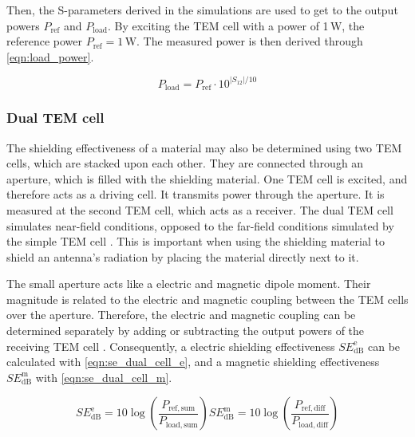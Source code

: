 Then, the S-parameters derived in the simulations are used to get to the output powers $P_\mathrm{ref}$ and $P_\mathrm{load}$. By exciting the TEM cell with a power of 1\,W, the reference power $P_\mathrm{ref}=1\,\mathrm{W}$. The measured power is then derived through \autoref{eqn:load_power}.

\begin{equation}
    P_\mathrm{load}=P_\mathrm{ref}\cdot10^{|S_\mathrm{12}|/10}
    \label{eqn:load_power}
\end{equation}



\subsubsection{Dual TEM cell}

The shielding effectiveness of a material may also be determined using two TEM cells, which are stacked upon each other. They are connected through an aperture, which is filled with the shielding material. One TEM cell is excited, and therefore acts as a driving cell. It transmits power through the aperture. It is measured at the second TEM cell, which acts as a receiver. The dual TEM cell simulates near-field conditions, opposed to the far-field conditions simulated by the simple TEM cell \cite{MORARI_BĂLAN_2015}. This is important when using the shielding material to shield an antenna's radiation by placing the material directly next to it.

The small aperture acts like a electric and magnetic dipole moment. Their magnitude is related to the electric and magnetic coupling between the TEM cells over the aperture. Therefore, the electric and magnetic coupling can be determined separately by adding or subtracting the output powers of the receiving TEM cell \cite{MORARI_BĂLAN_2015, 4091811}. Consequently, a electric shielding effectiveness $SE_\mathrm{dB}^\mathrm{e}$ can be calculated with \autoref{eqn:se_dual_cell_e}, and a magnetic shielding effectiveness $SE_\mathrm{dB}^\mathrm{m}$ with \autoref{eqn:se_dual_cell_m}.


\begin{subequations}
    \begin{equation}
        SE_\mathrm{dB}^\mathrm{e}=10\log{\left( \frac{P_\mathrm{ref, sum}}{P_\mathrm{load,sum}} \right)}
        \label{eqn:se_dual_cell_e}
    \end{equation}
    \begin{equation}
        SE_\mathrm{dB}^\mathrm{m}=10\log{\left( \frac{P_\mathrm{ref, diff}}{P_\mathrm{load,diff}} \right)}
        \label{eqn:se_dual_cell_m}
    \end{equation}
\end{subequations}



